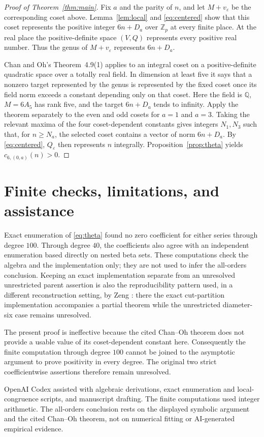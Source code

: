 \documentclass[11pt]{article}
\theoremstyle{remark}
\newcommand{\Z}{\mathbb Z}
\begin{document}
\begin{proof}[Proof of Theorem~\ref{thm:main}]
Fix $a$ and the parity of $n$, and let $M+v_\varepsilon$ be the corresponding
coset above.  Lemma~\ref{lem:local} and \eqref{eq:centered} show that this
coset represents the positive integer $6n+D_a$ over $\Z_p$ at every finite
place.  At the real place the positive-definite space $(V,Q)$ represents
every positive real number.  Thus the genus of $M+v_\varepsilon$ represents
$6n+D_a$.

Chan and Oh's Theorem~4.9(1) \cite{ChanOh2012} applies to an integral coset
on a positive-definite quadratic space over a totally real field.  In
dimension at least five it says that a nonzero target represented by the
genus is represented by the fixed coset once its field norm exceeds a
constant depending only on that coset.  Here the field is $\mathbb Q$,
$M=6A_5$ has rank five, and the target $6n+D_a$ tends to infinity.  Apply the
theorem separately to the even and odd cosets for $a=1$ and $a=3$.  Taking
the relevant maxima of the four coset-dependent constants gives integers
$N_1,N_3$ such that, for $n\geq N_a$, the selected coset contains a vector
of norm $6n+D_a$.  By \eqref{eq:centered}, $Q_\varepsilon$ then represents
$n$ integrally.  Proposition~\ref{prop:theta} yields
$c_{6,(0,a)}(n)>0$.
\end{proof}

\section{Finite checks, limitations, and assistance}

Exact enumeration of \eqref{eq:theta} found no zero coefficient for either
series through degree $100$.  Through degree $40$, the coefficients also
agree with an independent enumeration based directly on nested beta sets.
These computations check the algebra and the implementation only; they are
not used to infer the all-orders conclusion.  Keeping an exact implementation
separate from an unresolved unrestricted parent assertion is also the
reproducibility pattern used, in a different reconstruction setting, by
Zeng \cite{Zeng2026MultiplicityArxiv}: there the exact cut-partition
implementation accompanies a partial theorem while the unrestricted
diameter-six case remains unresolved.

The present proof is ineffective because the cited Chan--Oh theorem does not
provide a usable value of its coset-dependent constant here.  Consequently
the finite computation through degree $100$ cannot be joined to the
asymptotic argument to prove positivity in every degree.  The original two
strict coefficientwise assertions therefore remain unresolved.

OpenAI Codex assisted with algebraic derivations, exact enumeration and
local-congruence scripts, and manuscript drafting.  The finite computations
used integer arithmetic.  The all-orders conclusion rests on the displayed
symbolic argument and the cited Chan--Oh theorem, not on numerical fitting or
AI-generated empirical evidence.



\end{document}
